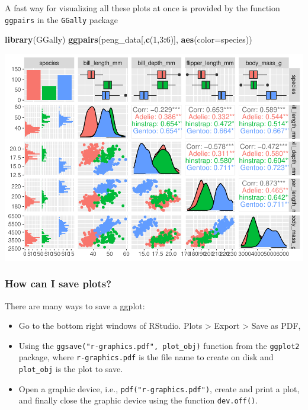 \documentclass[
]{article}
\newenvironment{Shaded}{\begin{snugshade}}{\end{snugshade}}
\newcommand{\AttributeTok}[1]{\textcolor[rgb]{0.13,0.29,0.53}{#1}}
\newcommand{\DecValTok}[1]{\textcolor[rgb]{0.00,0.00,0.81}{#1}}
\newcommand{\FunctionTok}[1]{\textcolor[rgb]{0.13,0.29,0.53}{\textbf{#1}}}
\newcommand{\NormalTok}[1]{#1}
\newcommand{\SpecialCharTok}[1]{\textcolor[rgb]{0.81,0.36,0.00}{\textbf{#1}}}
\begin{document}
A fast way for visualizing all these plots at once is provided by the
function \texttt{ggpairs} in the \texttt{GGally} package

\begin{Shaded}
\begin{Highlighting}[]
\FunctionTok{library}\NormalTok{(GGally)}
\FunctionTok{ggpairs}\NormalTok{(peng\_data[,}\FunctionTok{c}\NormalTok{(}\DecValTok{1}\NormalTok{,}\DecValTok{3}\SpecialCharTok{:}\DecValTok{6}\NormalTok{)], }\FunctionTok{aes}\NormalTok{(}\AttributeTok{color=}\NormalTok{species))}
\end{Highlighting}
\end{Shaded}

\includegraphics{EDA_files/figure-latex/unnamed-chunk-37-1.pdf}

\hypertarget{how-can-i-save-plots}{%
\subsubsection{How can I save plots?}\label{how-can-i-save-plots}}

There are many ways to save a ggplot:

\begin{itemize}
\item
  Go to the bottom right windows of RStudio. Plots \textgreater{} Export
  \textgreater{} Save as PDF,
\item
  Using the \texttt{ggsave("r-graphics.pdf",\ plot\_obj)} function from
  the \texttt{ggplot2} package, where \texttt{r-graphics.pdf} is the
  file name to create on disk and \texttt{plot\_obj} is the plot to
  save.
\item
  Open a graphic device, i.e., \texttt{pdf("r-graphics.pdf")}, create
  and print a plot, and finally close the graphic device using the
  function \texttt{dev.off()}.
\end{itemize}
\end{document}
